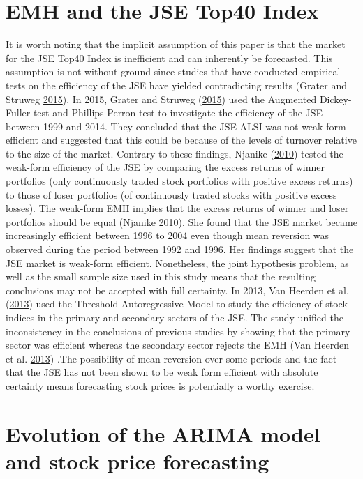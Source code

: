\documentclass[12pt,preprint, authoryear]{elsarticle}
\numberwithin{equation}{section}
\numberwithin{figure}{section}
\numberwithin{table}{section}
\begin{document}
\section{EMH and the JSE Top40 Index}\label{emh-and-the-jse-top40-index}

It is worth noting that the implicit assumption of this paper is that
the market for the JSE Top40 Index is inefficient and can inherently be
forecasted. This assumption is not without ground since studies that
have conducted empirical tests on the efficiency of the JSE have yielded
contradicting results (Grater and Struweg
\protect\hyperlink{ref-GraterUOJ}{2015}). In 2015, Grater and Struweg
(\protect\hyperlink{ref-GraterUOJ}{2015}) used the Augmented
Dickey-Fuller test and Phillips-Perron test to investigate the
efficiency of the JSE between 1999 and 2014. They concluded that the JSE
ALSI was not weak-form efficient and suggested that this could be
because of the levels of turnover relative to the size of the market.
Contrary to these findings, Njanike
(\protect\hyperlink{ref-Njanike2010}{2010}) tested the weak-form
efficiency of the JSE by comparing the excess returns of winner
portfolios (only continuously traded stock portfolios with positive
excess returns) to those of loser portfolios (of continuously traded
stocks with positive excess losses). The weak-form EMH implies that the
excess returns of winner and loser portfolios should be equal (Njanike
\protect\hyperlink{ref-Njanike2010}{2010}). She found that the JSE
market became increasingly efficient between 1996 to 2004 even though
mean reversion was observed during the period between 1992 and 1996. Her
findings suggest that the JSE market is weak-form efficient.
Nonetheless, the joint hypothesis problem, as well as the small sample
size used in this study means that the resulting conclusions may not be
accepted with full certainty. In 2013, Van Heerden et al.
(\protect\hyperlink{ref-van2013efficient}{2013}) used the Threshold
Autoregressive Model to study the efficiency of stock indices in the
primary and secondary sectors of the JSE. The study unified the
inconsistency in the conclusions of previous studies by showing that the
primary sector was efficient whereas the secondary sector rejects the
EMH (Van Heerden et al. \protect\hyperlink{ref-van2013efficient}{2013})
.The possibility of mean reversion over some periods and the fact that
the JSE has not been shown to be weak form efficient with absolute
certainty means forecasting stock prices is potentially a worthy
exercise.

\section{Evolution of the ARIMA model and stock price
forecasting}\label{evolution-of-the-arima-model-and-stock-price-forecasting}
\end{document}
